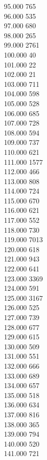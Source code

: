 { 95.000	765 \\
 96.000	535 \\
 97.000	680 \\
 98.000	265 \\
 99.000	2761 \\
 100.000	40 \\
 101.000	22 \\
 102.000	21 \\
 103.000	711 \\
 104.000	598 \\
 105.000	528 \\
 106.000	685 \\
 107.000	728 \\
 108.000	594 \\
 109.000	737 \\
 110.000	621 \\
 111.000	1577 \\
 112.000	466 \\
 113.000	808 \\
 114.000	724 \\
 115.000	670 \\
 116.000	621 \\
 117.000	552 \\
 118.000	730 \\
 119.000	7013 \\
 120.000	618 \\
 121.000	943 \\
 122.000	641 \\
 123.000	3369 \\
 124.000	591 \\
 125.000	3167 \\
 126.000	525 \\
 127.000	739 \\
 128.000	677 \\
 129.000	615 \\
 130.000	509 \\
 131.000	551 \\
 132.000	666 \\
 133.000	689 \\
 134.000	657 \\
 135.000	518 \\
 136.000	634 \\
 137.000	816 \\
 138.000	365 \\
 139.000	794 \\
 140.000	520 \\
 141.000	721 \\
}
